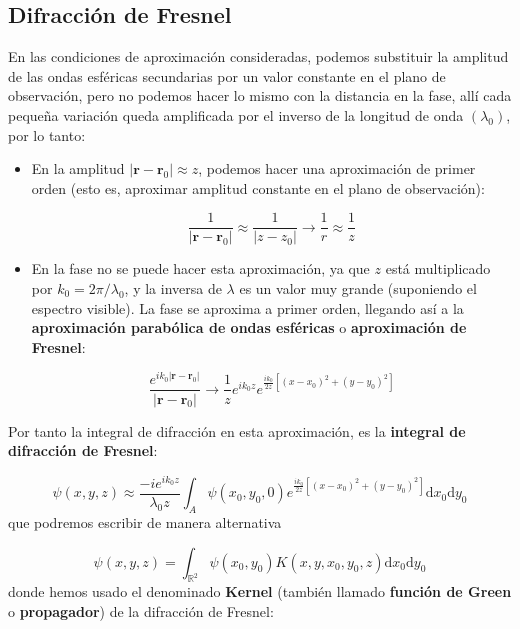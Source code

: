 \documentclass[12pt,a4paper]{book}
\numberwithin{equation}{section}
\numberwithin{figure}{section}
\newcommand{\ccorchetes}[1]{\left[ #1  \right]}
\newcommand{\D}{\mathrm{d}}
\newcommand{\1}{_{(1)}}
\newcommand{\2}{_{(2)}}
\newcommand{\rn}{\mathbf{r}}
\theoremstyle{definition}
\begin{document}
\subsection{Difracción de Fresnel}
En las condiciones de aproximación consideradas, podemos substituir la amplitud de las ondas esféricas secundarias por un valor constante en el plano de observación, pero no podemos hacer lo mismo con la distancia en la fase, allí cada pequeña variación queda amplificada por el inverso de la longitud de onda $(\lambda_0)$, por lo tanto: \\

\begin{itemize}
    \item En la amplitud $|\rn-\rn_0|\approx z$, podemos hacer una aproximación de primer orden (esto es, aproximar amplitud constante en el plano de observación):

    \begin{equation}
        \frac{1}{|\rn-\rn_0|} \approx \frac{1}{|z-z_0|} \longrightarrow \frac{1}{r} \approx \frac{1}{z}
    \end{equation}

    \item En la fase no se puede hacer esta aproximación, ya que $z$ está multiplicado por $k_0 = 2\pi / \lambda_0$, y la inversa de $\lambda$ es un valor muy grande (suponiendo el espectro visible). La fase se aproxima a primer orden, llegando así a la \textbf{aproximación parabólica de ondas esféricas} o \textbf{aproximación de Fresnel}:

    \begin{equation}
        \frac{e^{ik_0|\rn-\rn_0|}}{|\rn-\rn_0|} \longrightarrow \frac{1}{z} e^{ik_0z} e^{\frac{ik_0}{2z} \ccorchetes{(x-x_0)^2+(y-y_0)^2}}
    \end{equation}
\end{itemize}

Por tanto la integral de difracción en esta aproximación, es la \textbf{integral de difracción de Fresnel}: 

\begin{equation}
    \psi (x,y,z) \approx \frac{-ie^{ik_0z}}{\lambda_0 z} \int_A \psi (x_0,y_0,0) e^{\frac{ik_0}{2z}\ccorchetes{(x-x_0)^2+(y-y_0)^2}} \D x_0 \D y_0
    \label{Ec:05.3-04}
\end{equation}
que podremos escribir de manera alternativa

\begin{equation}
    \psi (x,y,z) = \int_{\mathbb{R}^2} \psi (x_0,y_0) K(x,y,x_0,y_0,z) \D x_0 \D y_0
\end{equation}
donde hemos usado el denominado \textbf{Kernel} (también llamado \textbf{función de Green} o \textbf{propagador}) de la difracción de Fresnel:
\end{document}

